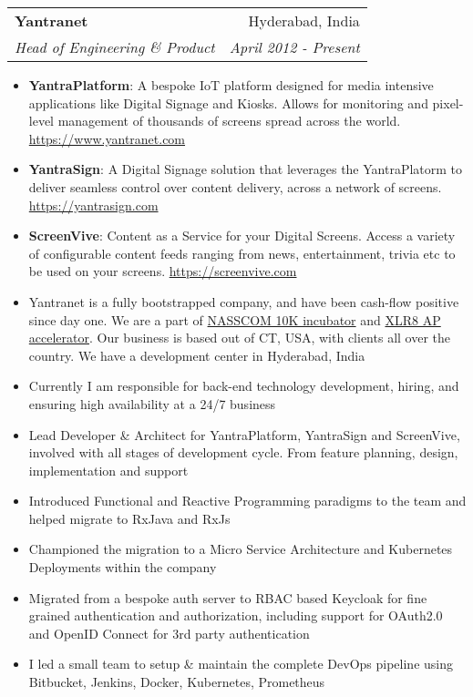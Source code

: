 \documentclass[letterpaper,11pt]{article}
\makeatletter
\newcommand{\resumeItem}[2]{
  \item\small{
    \textbf{#1}{: #2 \vspace{-2pt}}
  }
}
\newcommand{\resumeSubheading}[4]{
  \vspace{-1pt}\item
    \begin{tabular*}{0.97\textwidth}[t]{l@{\extracolsep{\fill}}r}
      \textbf{#1} & #2 \\
      \textit{\small#3} & \textit{\small #4} \\
    \end{tabular*}\vspace{-5pt}
}
\newcommand{\resumeItemListStart}{\begin{itemize}}
\newcommand{\resumeItemListEnd}{\end{itemize}\vspace{-5pt}}
\makeatother
\begin{document}
    \resumeSubheading
      {Yantranet}{Hyderabad, India}
      {Head of Engineering \& Product}{April 2012 - Present}
      \resumeItemListStart
        \resumeItem{YantraPlatform} 
          {A bespoke IoT platform designed for media intensive applications like Digital Signage and Kiosks. Allows for monitoring and pixel-level management of thousands of screens spread across the world. \href{https://www.yantranet.com}{https://www.yantranet.com}}
        \resumeItem{YantraSign}
          {A Digital Signage solution that leverages the YantraPlatorm to deliver seamless control over content delivery, across a network of screens. \href{https://yantrasign.com}{https://yantrasign.com}}
        \resumeItem{ScreenVive} 
          {Content as a Service for your Digital Screens. Access a variety of configurable content feeds ranging from  news, entertainment, trivia etc to be used on your screens. \href{https://screenvive.com}{https://screenvive.com}}
        \item{Yantranet is a fully bootstrapped company, and have been cash-flow positive since day one. We are a part of \href{http://10000startups.com/our-startups}{NASSCOM 10K incubator} and \href{http://xlr8ap.com}{XLR8 AP accelerator}. Our business is based out of CT, USA, with clients all over the country. We have a development center in Hyderabad, India}
        \item{Currently I am responsible for back-end technology development, hiring, and ensuring high availability at a 24/7 business}
        \item{Lead Developer \& Architect for YantraPlatform, YantraSign and ScreenVive, involved with all stages of development cycle. From feature planning, design, implementation and support}
        \item{Introduced Functional and Reactive Programming paradigms to the team and helped migrate to RxJava and RxJs}
        \item{Championed the migration to a Micro Service Architecture and Kubernetes Deployments within the company}
        \item{Migrated from a bespoke auth server to RBAC based Keycloak for fine grained authentication and authorization, including support for OAuth2.0 and OpenID Connect for 3rd party authentication}
        \item{I led a small team to setup \& maintain the complete DevOps pipeline using Bitbucket, Jenkins, Docker, Kubernetes, Prometheus}
      \resumeItemListEnd
  
\end{document}
